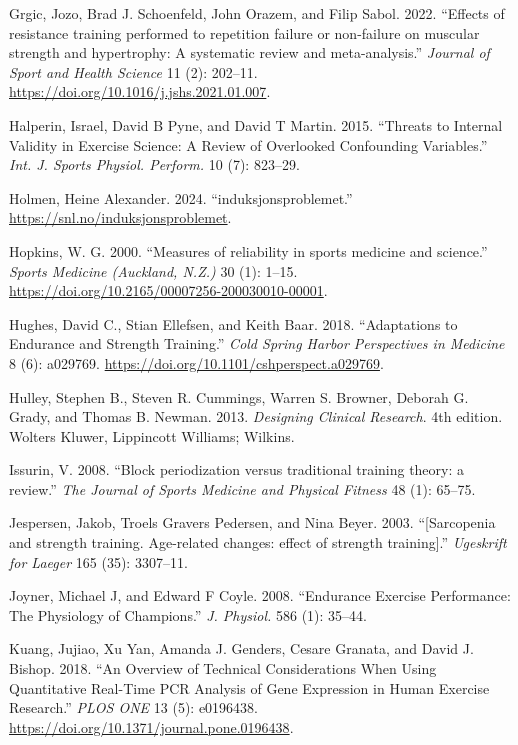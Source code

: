 \documentclass[
  letterpaper,
  DIV=11,
  numbers=noendperiod]{scrreprt}
\newlength{\cslhangindent}
\newenvironment{CSLReferences}[2] %
 {\begin{list}{}{%
  \setlength{\itemindent}{0pt}
  \setlength{\leftmargin}{0pt}
  \setlength{\parsep}{0pt}
  \ifodd #1
   \setlength{\leftmargin}{\cslhangindent}
   \setlength{\itemindent}{-1\cslhangindent}
  \fi
  \setlength{\itemsep}{#2\baselineskip}}}
 {\end{list}}
\begin{document}
\begin{CSLReferences}{1}{0}
Grgic, Jozo, Brad J. Schoenfeld, John Orazem, and Filip Sabol. 2022.
{``Effects of resistance training performed to repetition failure or
non-failure on muscular strength and hypertrophy: A systematic review
and meta-analysis.''} \emph{Journal of Sport and Health Science} 11 (2):
202--11. \url{https://doi.org/10.1016/j.jshs.2021.01.007}.

Halperin, Israel, David B Pyne, and David T Martin. 2015. {``Threats to
Internal Validity in Exercise Science: A Review of Overlooked
Confounding Variables.''} \emph{Int. J. Sports Physiol. Perform.} 10
(7): 823--29.

Holmen, Heine Alexander. 2024. {``induksjonsproblemet.''}
\url{https://snl.no/induksjonsproblemet}.

Hopkins, W. G. 2000. {``Measures of reliability in sports medicine and
science.''} \emph{Sports Medicine (Auckland, N.Z.)} 30 (1): 1--15.
\url{https://doi.org/10.2165/00007256-200030010-00001}.

Hughes, David C., Stian Ellefsen, and Keith Baar. 2018. {``Adaptations
to Endurance and Strength Training.''} \emph{Cold Spring Harbor
Perspectives in Medicine} 8 (6): a029769.
\url{https://doi.org/10.1101/cshperspect.a029769}.

Hulley, Stephen B., Steven R. Cummings, Warren S. Browner, Deborah G.
Grady, and Thomas B. Newman. 2013. \emph{Designing Clinical Research}.
4th edition. Wolters Kluwer, Lippincott Williams; Wilkins.

Issurin, V. 2008. {``Block periodization versus traditional training
theory: a review.''} \emph{The Journal of Sports Medicine and Physical
Fitness} 48 (1): 65--75.

Jespersen, Jakob, Troels Gravers Pedersen, and Nina Beyer. 2003.
{``{[}Sarcopenia and strength training. Age-related changes: effect of
strength training{]}.''} \emph{Ugeskrift for Laeger} 165 (35): 3307--11.

Joyner, Michael J, and Edward F Coyle. 2008. {``Endurance Exercise
Performance: The Physiology of Champions.''} \emph{J. Physiol.} 586 (1):
35--44.

Kuang, Jujiao, Xu Yan, Amanda J. Genders, Cesare Granata, and David J.
Bishop. 2018. {``An Overview of Technical Considerations When Using
Quantitative Real-Time PCR Analysis of Gene Expression in Human Exercise
Research.''} \emph{PLOS ONE} 13 (5): e0196438.
\url{https://doi.org/10.1371/journal.pone.0196438}.


\end{CSLReferences}
\end{document}
